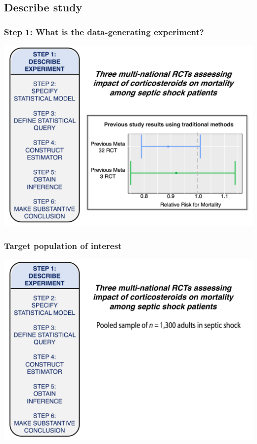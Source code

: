 \documentclass[t]{beamer}
\begin{document}
\subsection{Describe study}
\begin{frame}
  \frametitle{Step 1: What is the data-generating experiment?}
  \vspace{-20pt}
  \begin{center}
  \includegraphics[width = 1.05\textwidth]{figures/roadmap1_1.pdf}
  \end{center}
\end{frame}

\begin{frame}
  \frametitle{Target population of interest}
  \vspace{-20pt}
  \begin{center}
  \includegraphics[width = 1.05\textwidth]{figures/data_1.pdf}
  \end{center}
\end{frame}
\end{document}
